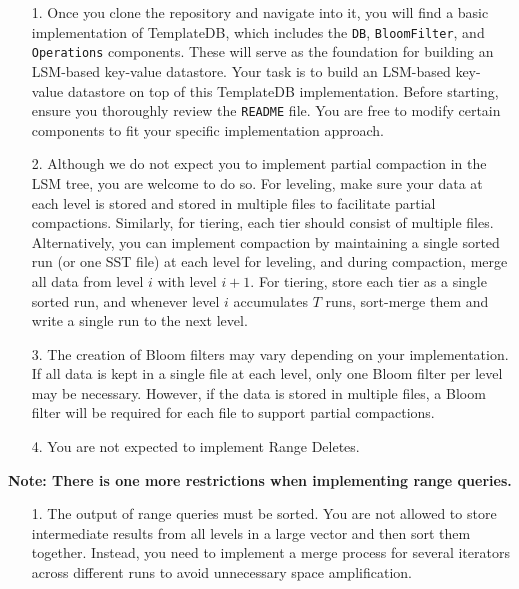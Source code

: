 \documentclass[12pt,a4paper,twoside]{article}
\begin{document}
\begin{enumerate}
    \item[1.] Once you clone the repository and navigate into it, you will find a basic implementation of TemplateDB, which includes the \texttt{DB}, \texttt{BloomFilter}, and \texttt{Operations} components.
    These will serve as the foundation for building an LSM-based key-value datastore.
    Your task is to build an LSM-based key-value datastore on top of this TemplateDB implementation. Before starting, ensure you thoroughly review the \texttt{README} file.
    You are free to modify certain components to fit your specific implementation approach.
    \item[2.] Although we do not expect you to implement partial compaction in the LSM tree, you are welcome to do so.
    For leveling, make sure your data at each level is stored and stored in multiple files to facilitate partial compactions.
    Similarly, for tiering, each tier should consist of multiple files.
    Alternatively, you can implement compaction by maintaining a single sorted run (or one SST file) at each level for leveling, and during compaction, merge all data from level $i$ with level $i+1$. 
    For tiering, store each tier as a single sorted run, and whenever level $i$ accumulates $T$ runs, sort-merge them and write a single run to the next level.
    \item[3. ] The creation of Bloom filters may vary depending on your implementation. If all data is kept in a single file at each level, only one Bloom filter per level may be necessary.
    However, if the data is stored in multiple files, a Bloom filter will be required for each file to support partial compactions.
    \item[4. ] You are not expected to implement Range Deletes.
\end{enumerate}
\textbf{Note: There is one more restrictions when implementing range queries.}
\begin{enumerate}
  \item[1.] The output of range queries must be sorted. You are not allowed to store intermediate results from all levels in a large vector and then sort them together. Instead, you need to implement a merge process for several iterators across different runs to avoid unnecessary space amplification.
\end{enumerate}


\end{document}
